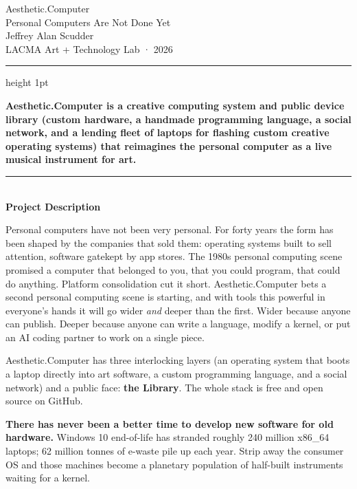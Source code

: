 \documentclass[12pt,letterpaper]{article}
\newcommand{\ac}{Aesthetic{\color{acpink}.}Computer}
\newcommand{\achead}[1]{%
  \vspace{1.6em}%
  {\color{acpink}\noindent\rule{\textwidth}{1.5pt}}\\[0.4em]
  {\large\bfseries #1}%
  \vspace{0.4em}%
}
\begin{document}
\thispagestyle{fancy}

\vspace*{0.8em}
\begin{center}
  {\acbold\fontsize{30pt}{34pt}\selectfont Aesthetic{\color{acpink}.}Computer}\\[14pt]
  {\large Personal Computers Are Not Done Yet}\\[24pt]
  {\color{acgray}\small Jeffrey Alan Scudder}\\[3pt]
  {\color{acgray}\small LACMA Art + Technology Lab · 2026}
\end{center}

\vspace{1.2em}
{\color{acpink}\hrule height 1pt}
\vspace{1em}

{\large\bfseries \ac{} is a creative computing system and public device library (custom hardware, a handmade programming language, a social network, and a lending fleet of laptops for flashing custom creative operating systems) that reimagines the personal computer as a live musical instrument for art.}

\achead{Project Description}

Personal computers have not been very personal. For forty years the form has been shaped by the companies that sold them: operating systems built to sell attention, software gatekept by app stores. The 1980s personal computing scene promised a computer that belonged to you, that you could program, that could do anything. Platform consolidation cut it short. \ac{} bets a second personal computing scene is starting, and with tools this powerful in everyone's hands it will go wider \emph{and} deeper than the first. Wider because anyone can publish. Deeper because anyone can write a language, modify a kernel, or put an AI coding partner to work on a single piece.

\ac{} has three interlocking layers (an operating system that boots a laptop directly into art software, a custom programming language, and a social network) and a public face: \textbf{the Library}. The whole stack is free and open source on GitHub.

\textbf{There has never been a better time to develop new software for old hardware.} Windows 10 end-of-life has stranded roughly 240 million x86\_64 laptops; 62 million tonnes of e-waste pile up each year. Strip away the consumer OS and those machines become a planetary population of half-built instruments waiting for a kernel.
\end{document}
